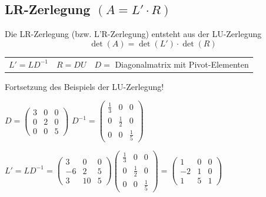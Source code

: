 \subsection[LR-Zerlegung]{LR-Zerlegung $(A = L' \cdot R)$}

Die LR-Zerlegung (bzw. L'R-Zerlegung)  entsteht aus der LU-Zerlegung
$$ \det(A) = \det(L') \cdot \det(R) $$

\begin{tabular}{lll}
	$L' = L D^{-1} $ & $R = DU$ & $D =$ Diagonalmatrix mit Pivot-Elementen 
\end{tabular}


		
		

Fortsetzung des Beispiels der LU-Zerlegung!

\vspace{0.2cm}

$D = \begin{pmatrix} 
		3 & 0 & 0 \\ 0 & 2 & 0 \\ 0 & 0 & 5 
	\end{pmatrix}$ 
\quad $D^{-1} = 
	\begin{pmatrix} 
		\frac{1}{3} & 0 & 0 \\ 0 & \frac{1}{2} & 0 \\ 0 & 0 & \frac{1}{5} 
	\end{pmatrix}$
		
\vspace{0.2cm}
		
$L' = L D^{-1} =
	\begin{pmatrix} 
		3 & 0 & 0 \\ -6 & 2 & 5 \\ 3 & 10 & 5 
	\end{pmatrix}  
	\begin{pmatrix} 
		\frac{1}{3} & 0 & 0 \\ 0 & \frac{1}{2} & 0 \\ 0 & 0 & \frac{1}{5}
	\end{pmatrix} 
	= 
	\begin{pmatrix} 
		1 & 0 & 0 \\ -2 & 1 & 0 \\ 1 & 5 & 1
	\end{pmatrix}$ 
		
